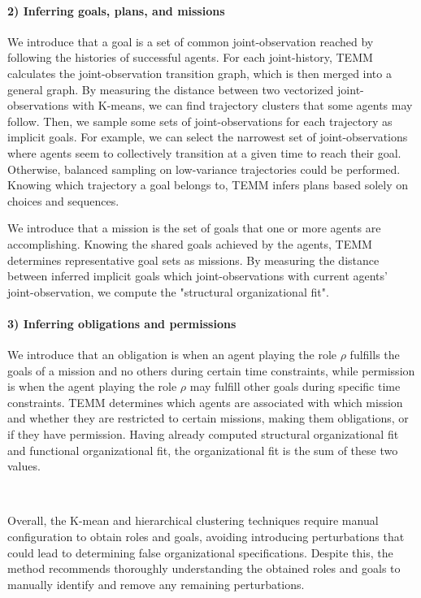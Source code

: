 \documentclass[pdflatex,sn-mathphys-num]{sn-jnl}%
\theoremstyle{thmstyleone}%
\theoremstyle{thmstyletwo}%
\theoremstyle{thmstylethree}%
\begin{document}
\paragraph{2) Inferring goals, plans, and missions}

We introduce that a goal is a set of common joint-observation reached by following the histories of successful agents.
For each joint-history, TEMM calculates the joint-observation transition graph, which is then merged into a general graph. By measuring the distance between two vectorized joint-observations with K-means, we can find trajectory clusters that some agents may follow. Then, we sample some sets of joint-observations for each trajectory as implicit goals. For example, we can select the narrowest set of joint-observations where agents seem to collectively transition at a given time to reach their goal. Otherwise, balanced sampling on low-variance trajectories could be performed. Knowing which trajectory a goal belongs to, TEMM infers plans based solely on choices and sequences.

We introduce that a mission is the set of goals that one or more agents are accomplishing.
Knowing the shared goals achieved by the agents, TEMM determines representative goal sets as missions.
By measuring the distance between inferred implicit goals which joint-observations with current agents' joint-observation, we compute the "structural organizational fit".

\paragraph{3) Inferring obligations and permissions}

We introduce that an obligation is when an agent playing the role $\rho$ fulfills the goals of a mission and no others during certain time constraints, while permission is when the agent playing the role $\rho$ may fulfill other goals during specific time constraints.
TEMM determines which agents are associated with which mission and whether they are restricted to certain missions, making them obligations, or if they have permission.
Having already computed structural organizational fit and functional organizational fit, the organizational fit is the sum of these two values.

\

Overall, the K-mean and hierarchical clustering techniques require manual configuration to obtain roles and goals, avoiding introducing perturbations that could lead to determining false organizational specifications. Despite this, the method recommends thoroughly understanding the obtained roles and goals to manually identify and remove any remaining perturbations.
\end{document}
